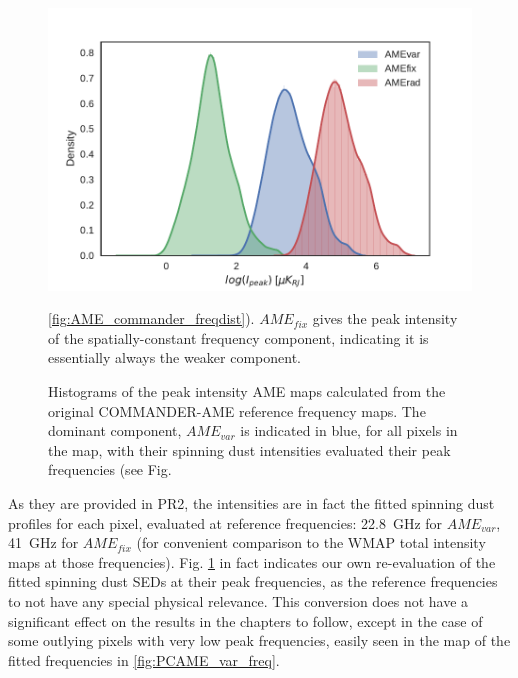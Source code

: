           \begin{figure}
           \includegraphics[width=\textwidth]{../Plots/ch_allsky/AME_comps_distplot.pdf}
           \centering
           \caption{Histograms of the peak intensity AME maps calculated from the original COMMANDER-AME reference frequency maps. The dominant component, $AME_{var}$ is indicated in blue, for all pixels in the map, with their spinning dust intensities evaluated their peak frequencies (see Fig.} \ref{fig:AME_commander_freqdist}).  $AME_{fix}$ gives the peak intensity of the spatially-constant frequency component, indicating it is essentially always the weaker component.
           \label{fig:AME_comps_distplot}
          \end{figure}
           As they are provided in PR2, the intensities are in fact the fitted spinning dust profiles for each pixel, evaluated at reference frequencies: 22.8~GHz for $AME_{var}$, 41~GHz for $AME_{fix}$ (for convenient comparison to the WMAP total intensity maps at those frequencies). Fig. \ref{fig:AME_comps_distplot} in fact indicates our own re-evaluation of the fitted spinning dust SEDs at their peak frequencies, as the reference frequencies to not have any special physical relevance. This conversion does not have a significant effect on the results in the chapters to follow, except in the case of some outlying pixels with very low peak frequencies, easily seen in the map of the fitted frequencies in \ref{fig:PCAME_var_freq}.
